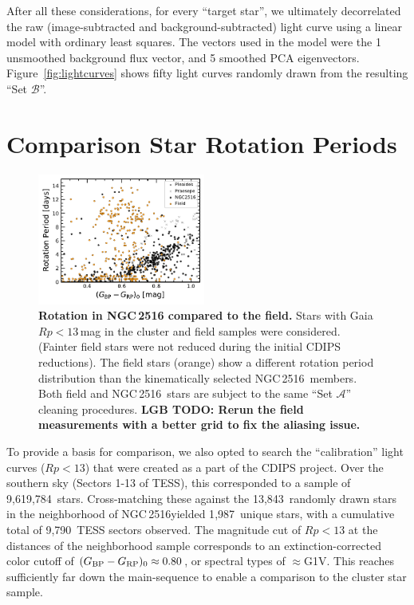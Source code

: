 \documentclass[12pt,twocolumn,tighten]{aastex63}
\newcommand{\cn}{NGC\,2516} %
\newcommand{\nnbhd}{13{,}843} %
\newcommand{\ncalibration}{9{,}619{,}784} %
\newcommand{\nnbhdcaliblc}{9{,}790} %
\newcommand{\nnbhdcalibstar}{1{,}987} %
\newcommand{\bpmrpo}{(G_{\rm BP}-G_{\rm RP})_0}
\begin{document}
After all these considerations, for every ``target star'', we
ultimately decorrelated the raw (image-subtracted and
background-subtracted) light curve using a linear model with ordinary
least squares.  The vectors used in the model were the 1
unsmoothed background flux vector, and 5 smoothed PCA eigenvectors.
Figure~\ref{fig:lightcurves} shows fifty light curves
randomly drawn from the resulting ``Set $\mathcal{B}$''.




\section{Comparison Star Rotation Periods}
\label{app:compstar}

\begin{figure}[t]
	\begin{center}
		\leavevmode
    \includegraphics[width=0.49\textwidth]{f9.pdf}
	\end{center}
	\vspace{-0.7cm}
	\caption{ {\bf Rotation in NGC\,2516 compared to the field.}
  Stars with Gaia $Rp<13$\,mag in the cluster and field samples were
  considered. (Fainter field stars were not reduced during
  the initial CDIPS reductions).  The field stars (orange) show a
  different rotation period distribution than the kinematically
  selected \cn\ members.
  Both field and \cn\ stars are subject to the same ``Set $\mathcal{A}$''
  cleaning procedures.
  {\bf LGB TODO: Rerun the field measurements with a better grid to fix the aliasing issue.}
  \label{fig:compstar}
	}
\end{figure}

To provide a basis for comparison, we also opted to search the
``calibration'' light curves ($Rp<13$) that were created as a part of
the CDIPS project.  Over the southern sky (Sectors 1-13 of TESS), this
corresponded to a sample of \ncalibration\ stars.  Cross-matching these
against the \nnbhd\ randomly drawn stars in the neighborhood of \cn yielded
\nnbhdcalibstar\ unique stars, with a cumulative total of
\nnbhdcaliblc\ TESS
sectors observed.
The magnitude cut of $Rp<13$ at the distances of the neighborhood sample
corresponds to an extinction-corrected color cutoff of $\bpmrpo
\approx 0.80$, or spectral types of $\approx$G1V.
This reaches sufficiently far down the main-sequence to enable a
comparison to the cluster star sample.
\end{document}
